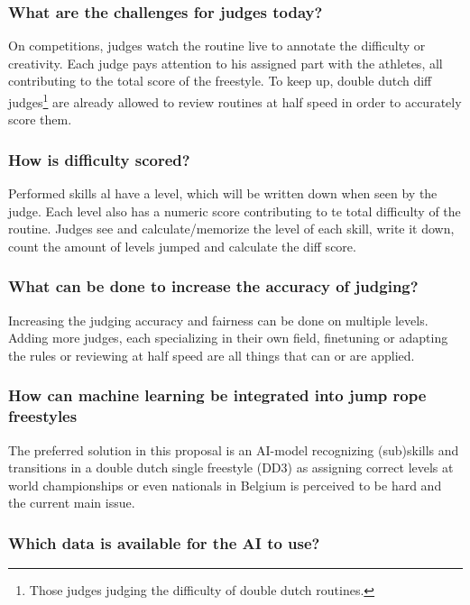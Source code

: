 \subsubsection{What are the challenges for judges today?}

On competitions, judges watch the routine live to annotate the difficulty or creativity. Each judge pays attention to his assigned part with the athletes, all contributing to the total score of the freestyle. To keep up, double dutch diff judges\footnote{Those judges judging the difficulty of double dutch routines.} are already allowed to review routines at half speed in order to accurately score them.

\subsubsection{How is difficulty scored?}

Performed skills al have a level, which will be written down when seen by the judge. Each level also has a numeric score contributing to te total difficulty of the routine. Judges see and calculate/memorize the level of each skill, write it down, count the amount of levels jumped and calculate the diff score.

\subsubsection{What can be done to increase the accuracy of judging?}

Increasing the judging accuracy and fairness can be done on multiple levels. Adding more judges, each specializing in their own field, finetuning or adapting the rules or reviewing at half speed are all things that can or are applied. %

\subsubsection{How can machine learning be integrated into jump rope freestyles}

The preferred solution in this proposal is an AI-model recognizing (sub)skills and transitions in a double dutch single freestyle (DD3) as assigning correct levels at world championships or even nationals in Belgium is perceived to be hard and the current main issue.

\subsubsection{Which data is available for the AI to use?}

